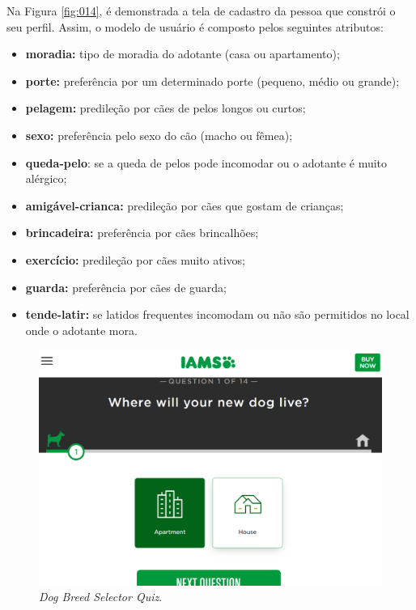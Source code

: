\documentclass[portuguese]{textolivre}
\begin{document}
Na Figura \ref{fig:014}, é demonstrada a tela de cadastro da pessoa que constrói o seu perfil. Assim, o modelo de usuário é composto pelos seguintes atributos:
 
 \begin{itemize}
    \item \textbf{moradia:} tipo de moradia do adotante (casa ou apartamento);
    \item \textbf{porte:} preferência por um determinado porte (pequeno, médio ou grande);
    \item \textbf{pelagem:} predileção por cães de pelos longos ou curtos;
    \item \textbf{sexo:} preferência pelo sexo do cão (macho ou fêmea);
    \item \textbf{queda-pelo}: se a queda de pelos pode incomodar ou o adotante é muito alérgico;
     \item \textbf{amigável-crianca:} predileção por cães que gostam de crianças;
     \item \textbf{brincadeira:} preferência por cães brincalhões;
     \item \textbf{exercício:} predileção por cães muito ativos;
     \item \textbf{guarda:} preferência por cães de guarda;
     \item \textbf{tende-latir:} se latidos frequentes incomodam ou não são permitidos no local onde o adotante mora.
 \end{itemize}
 
\begin{figure}
	\centering
	\includegraphics[scale=0.48]{imagens/fig-012.png}
	\caption{\textit{Dog Breed Selector Quiz}.}
	\label{fig:012}
\end{figure}
\end{document}
